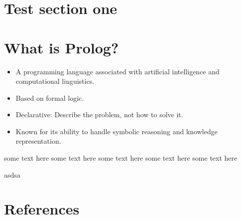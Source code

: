 \documentclass[twocolumn,landscape,9pt]{book}
\begin{document}
\section{Test section one}

\section{What is Prolog?}
\begin{itemize}
    \item A programming language associated with artificial intelligence and computational linguistics.
    \item Based on formal logic.
    \item Declarative: Describe the problem, not how to solve it.
    \item Known for its ability to handle symbolic reasoning and knowledge representation.
\end{itemize}


   some text here some text here some text here some text here some text here
    \begin{center}
       asdsa
     \end{center}

\section{References}
         
         
\end{document}
